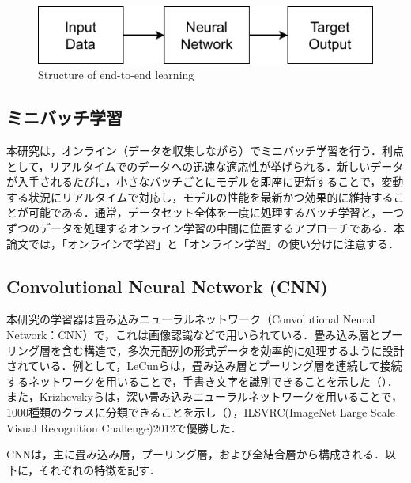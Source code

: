   \vspace{2cm}

  \begin{figure}[h]
    \centering
    \includegraphics[keepaspectratio, scale=0.70] {images/RobotGuidance_about_end-to-end.png}
    \caption{Structure of end-to-end learning}
    \label{Fig:about_end-to-end}
  \end{figure}

  \vspace{1cm}

\subsection{ミニバッチ学習}

  本研究は，オンライン（データを収集しながら）でミニバッチ学習を行う．利点として，リアルタイムでのデータへの迅速な適応性が挙げられる．新しいデータが入手されるたびに，小さなバッチごとにモデルを即座に更新することで，変動する状況にリアルタイムで対応し，モデルの性能を最新かつ効果的に維持することが可能である．通常，データセット全体を一度に処理するバッチ学習と，一つずつのデータを処理するオンライン学習の中間に位置するアプローチである．本論文では，「オンラインで学習」と「オンライン学習」の使い分けに注意する．

\newpage

\subsection{Convolutional Neural Network (CNN)}

  本研究の学習器は畳み込みニューラルネットワーク（Convolutional Neural Network：CNN）で，これは画像認識などで用いられている\cite{yann1}\cite{alex}．畳み込み層とプーリング層を含む構造で，多次元配列の形式データを効率的に処理するように設計されている．例として，LeCunら\cite{yann1}は，畳み込み層とプーリング層を連続して接続するネットワークを用いることで，手書き文字を識別できることを示した（）．また，Krizhevskyら\cite{alex}は，深い畳み込みニューラルネットワークを用いることで，1000種類のクラスに分類できることを示し（），ILSVRC(ImageNet Large Scale Visual Recognition Challenge)2012で優勝した．

  CNNは，主に畳み込み層，プーリング層，および全結合層から構成される．以下に，それぞれの特徴を記す．

